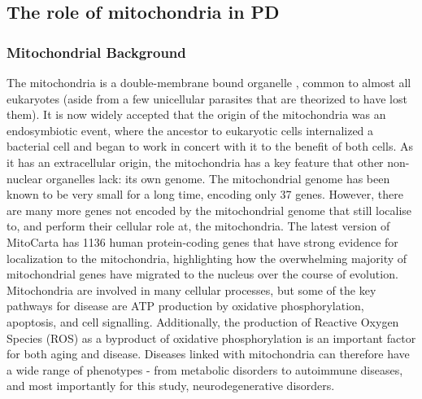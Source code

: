 \documentclass{article}
\begin{document}
\subsection{The role of mitochondria in PD}
\subsubsection{Mitochondrial Background}
The mitochondria is a double-membrane bound organelle , common to almost all eukaryotes (aside from a few unicellular parasites that are theorized to have lost them\cite{Karnkowska2016AOrganelle}). It is now widely accepted that the origin of the mitochondria was an endosymbiotic event\cite{Martin2015EndosymbioticOrigin.}, where the ancestor to eukaryotic cells internalized a bacterial cell and began to work in concert with it to the benefit of both cells. As it has an extracellular origin, the mitochondria has a key feature that other non-nuclear organelles lack: its own genome. The mitochondrial genome has been known to be very small for a long time\cite{Taanman1999TheReplication}, encoding only 37 genes. However, there are many more genes not encoded by the mitochondrial genome that still localise to, and perform their cellular role at, the mitochondria. The latest version of MitoCarta\cite{Rath2021MitoCarta3.0:Annotations} has 1136 human protein-coding genes that have strong evidence for localization to the mitochondria, highlighting how the overwhelming majority of mitochondrial genes have migrated to the nucleus over the course of evolution.
Mitochondria are involved in many cellular processes, but some of the key pathways for disease are ATP production by oxidative phosphorylation, apoptosis, and cell signalling\cite{Rossmann2021MitochondrialDisease}. Additionally, the production of Reactive Oxygen Species (ROS) as a byproduct of oxidative phosphorylation is an important factor for both aging and disease\cite{Brieger2012ReactiveDisease}. Diseases linked with mitochondria can therefore have a wide range of phenotypes - from metabolic disorders\cite{Bhatti2017MitochondrialStrategies} to autoimmune diseases\cite{Xu2020EmergingDiseases}, and most importantly for this study, neurodegenerative disorders\cite{MonzioCompagnoni2020TheDisease}.
\end{document}
